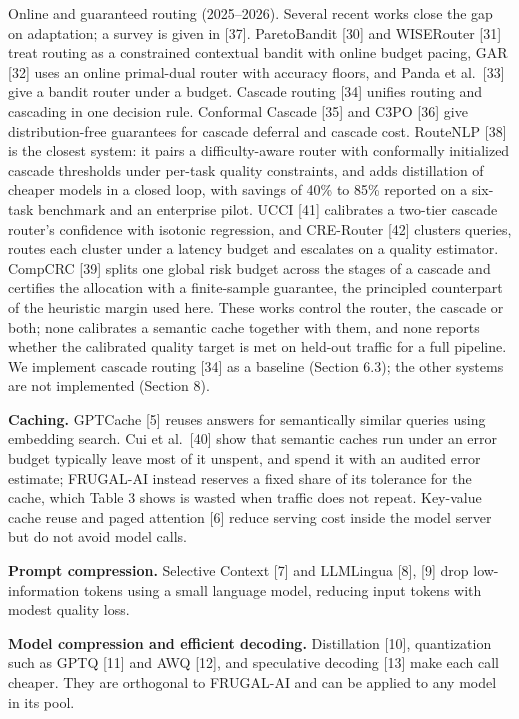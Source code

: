 \documentclass[
  10pt,
]{article}
\newcounter{none} %
\begin{document}
Online and guaranteed routing (2025--2026). Several recent works close
the gap on adaptation; a survey is given in {[}37{]}. ParetoBandit
{[}30{]} and WISERouter {[}31{]} treat routing as a constrained
contextual bandit with online budget pacing, GAR {[}32{]} uses an online
primal-dual router with accuracy floors, and Panda et al.~{[}33{]} give
a bandit router under a budget. Cascade routing {[}34{]} unifies routing
and cascading in one decision rule. Conformal Cascade {[}35{]} and C3PO
{[}36{]} give distribution-free guarantees for cascade deferral and
cascade cost. RouteNLP {[}38{]} is the closest system: it pairs a
difficulty-aware router with conformally initialized cascade thresholds
under per-task quality constraints, and adds distillation of cheaper
models in a closed loop, with savings of 40\% to 85\% reported on a
six-task benchmark and an enterprise pilot. UCCI {[}41{]} calibrates a
two-tier cascade router's confidence with isotonic regression, and
CRE-Router {[}42{]} clusters queries, routes each cluster under a
latency budget and escalates on a quality estimator. CompCRC {[}39{]}
splits one global risk budget across the stages of a cascade and
certifies the allocation with a finite-sample guarantee, the principled
counterpart of the heuristic margin used here. These works control the
router, the cascade or both; none calibrates a semantic cache together
with them, and none reports whether the calibrated quality target is met
on held-out traffic for a full pipeline. We implement cascade routing
{[}34{]} as a baseline (Section 6.3); the other systems are not
implemented (Section 8).

\textbf{Caching.} GPTCache {[}5{]} reuses answers for semantically
similar queries using embedding search. Cui et al.~{[}40{]} show that
semantic caches run under an error budget typically leave most of it
unspent, and spend it with an audited error estimate; FRUGAL-AI instead
reserves a fixed share of its tolerance for the cache, which Table 3
shows is wasted when traffic does not repeat. Key-value cache reuse and
paged attention {[}6{]} reduce serving cost inside the model server but
do not avoid model calls.

\textbf{Prompt compression.} Selective Context {[}7{]} and LLMLingua
{[}8{]}, {[}9{]} drop low-information tokens using a small language
model, reducing input tokens with modest quality loss.

\textbf{Model compression and efficient decoding.} Distillation
{[}10{]}, quantization such as GPTQ {[}11{]} and AWQ {[}12{]}, and
speculative decoding {[}13{]} make each call cheaper. They are
orthogonal to FRUGAL-AI and can be applied to any model in its pool.
\end{document}

